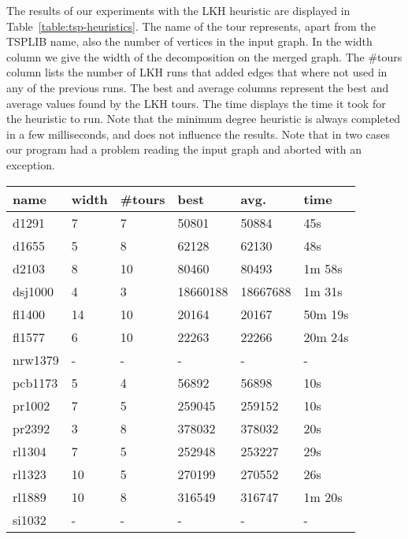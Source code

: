 \documentclass[titlepage, 12pt]{article}
\begin{document}
    The results of our experiments with the LKH heuristic are displayed in
    Table~\ref{table:tsp-heuristics}. The name of the tour represents, apart from the TSPLIB name,
    also the number of vertices in the input graph.  In the width column we give the width of the
    decomposition on the merged graph. The \#tours column lists the number of LKH runs that added
    edges that where not used in any of the previous runs. The best and average columns represent
    the best and average values found by the LKH tours. The time displays the time it took for the
    heuristic to run. Note that the minimum degree heuristic is always completed in a few
    milliseconds, and does not influence the results.
    Note that in two cases our program had a problem reading the input graph and aborted with an
    exception.

    \begin{table}
    \begin{tabular}{l l l l l l}
        name    & width & \#tours   & best      & avg.      & time \\ \hline
        d1291   & 7     & 7         & 50801     & 50884     & 45s \\
        d1655   & 5     & 8         & 62128     & 62130     & 48s \\
        d2103   & 8     & 10        & 80460     & 80493     & 1m 58s \\
        dsj1000 & 4     & 3         & 18660188  & 18667688  & 1m 31s \\
        fl1400  & 14    & 10        & 20164     & 20167     & 50m 19s \\
        fl1577  & 6     & 10        & 22263     & 22266     & 20m 24s \\
        nrw1379 & -     & -         & -         & -         & - \\
        pcb1173 & 5     & 4         & 56892     & 56898     & 10s \\
        pr1002  & 7     & 5         & 259045    & 259152    & 10s \\
        pr2392  & 3     & 8         & 378032    & 378032    & 20s \\
        rl1304  & 7     & 5         & 252948    & 253227    & 29s \\
        rl1323  & 10    & 5         & 270199    & 270552    & 26s \\
        rl1889  & 10    & 8         & 316549    & 316747    & 1m 20s \\
        si1032  & -     & -         & -         & -         & - \\

\end{tabular}
\end{table}
\end{document}
